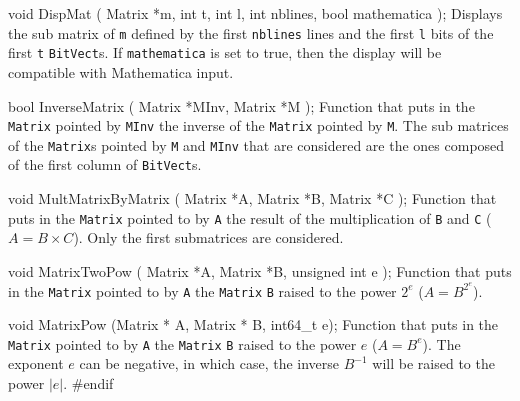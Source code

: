 void DispMat ( Matrix *m,
               int t,
               int l,
               int nblines,
               bool mathematica
            );
\endcode
 \tab
Displays the sub matrix of {\tt *m} defined by the first {\tt nblines} lines and the first {\tt l} bits of the first
{\tt t} {\tt BitVect}s.  If {\tt mathematica} is set to true, then the display will be compatible with
Mathematica input.
 \endtab
\code


bool InverseMatrix ( Matrix *MInv,
                        Matrix *M
                      );
\endcode
\tab
Function that puts in the {\tt Matrix} pointed by {\tt MInv} the inverse of the {\tt Matrix} pointed by {\tt M}.
The sub matrices of the {\tt Matrix}s pointed by {\tt M} and {\tt MInv} that are considered are the ones composed of
the first column of {\tt BitVect}s.
\endtab
\code


void MultMatrixByMatrix ( Matrix *A,
                          Matrix *B,
                          Matrix *C
                        );
\endcode
\tab
Function that puts in the {\tt Matrix} pointed to by {\tt A} the result of the
multiplication of {\tt B} and {\tt C} ($A = B \times C$).
Only the first submatrices are considered.
\endtab
\code


void MatrixTwoPow ( Matrix *A,
                    Matrix *B,
                    unsigned int e
                  );
\endcode
\tab
Function that puts in the {\tt Matrix} pointed to by {\tt A} the {\tt Matrix}
{\tt B} raised to the power $2^{e}$ ($A = B^{2^{e}}$).
\endtab
\code

void MatrixPow (Matrix * A, Matrix * B, int64_t e);
\endcode
\tab
Function that puts in the {\tt Matrix} pointed to by {\tt A} the {\tt Matrix}
{\tt B} raised to the power $e$ ($A = B^{e}$).
The exponent $e$ can be negative, in which case, the inverse $B^{-1}$
 will be raised to the power $|e|$.
\endtab
\code
\hide
#endif
\endhide
\endcode
